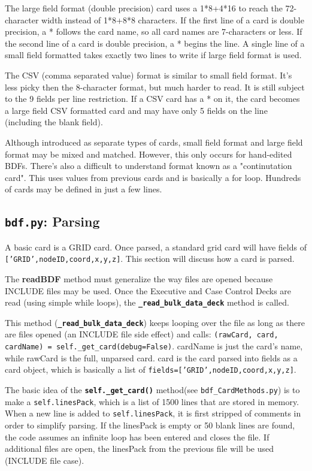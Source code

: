      The large field format (double precision) card uses a 1*8+4*16 to reach the 72-character width instead of 1*8+8*8 characters.  If the first line of a card is double precision, a * follows the card name, so all card names are 7-characters or less.  If the second line of a card is double precision, a * begins the line.  A single line of a small field formatted takes exactly two lines to write if large field format is used.
     
     The CSV (comma separated value) format is similar to small field format.  It's less picky then the 8-character format, but much harder to read.  It is still subject to the 9 fields per line restriction.  If a CSV card has a * on it, the card becomes a large field CSV formatted card and may have only 5 fields on the line (including the blank field).
     
     Although introduced as separate types of cards, small field format and large field format may be mixed and matched.  However, this only occurs for hand-edited BDFs.  There's also a difficult to understand format known as a "continutation card".  This uses values from previous cards and is basically a for loop.  Hundreds of cards may be defined in just a few lines.
     
 \subsection{{\tt bdf.py}: Parsing}
     A basic card is a GRID card.  Once parsed, a standard grid card will have fields of {\tt ['GRID',nodeID,coord,x,y,z]}.  This section will discuss how a card is parsed.  
     
     The {\bf readBDF} method must generalize the way files are opened because INCLUDE files may be used.  Once the Executive and Case Control Decks are read (using simple while loops), the {\bf \tt \_read\_bulk\_data\_deck} method is called.
     
     This method ({\bf \tt \_read\_bulk\_data\_deck}) keeps looping over the file as long as there are files opened (an INCLUDE file side effect) and calls:
     {\tt (rawCard, card, cardName) = self.\_get\_card(debug=False)}.  cardName is just the card's name, while rawCard is the full, unparsed card.  card is the card parsed into fields as a card object, which is basically a list of {\tt fields=['GRID',nodeID,coord,x,y,z]}.

     The basic idea of the {\bf \tt self.\_get\_card()} method(see {\tt bdf\_CardMethods.py}) is to make a {\tt self.linesPack}, which is a list of 1500 lines that are stored in memory.  When a new line is added to {\tt self.linesPack}, it is first stripped of comments in order to simplify parsing.  If the linesPack is empty or 50 blank lines are found, the code assumes an infinite loop has been entered and closes the file.  If additional files are open, the linesPack from the previous file will be used (INCLUDE file case).
     
